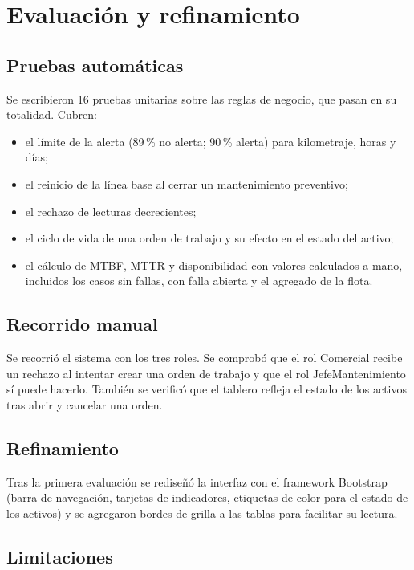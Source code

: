 \documentclass[12pt,letterpaper]{article}
\begin{document}
\section{Evaluación y refinamiento}\label{sec:evaluacion}

\subsection{Pruebas automáticas}

Se escribieron 16 pruebas unitarias sobre las reglas de negocio, que pasan en su totalidad. Cubren:

\begin{itemize}
  \item el límite de la alerta (89\,\% no alerta; 90\,\% alerta) para kilometraje, horas y días;
  \item el reinicio de la línea base al cerrar un mantenimiento preventivo;
  \item el rechazo de lecturas decrecientes;
  \item el ciclo de vida de una orden de trabajo y su efecto en el estado del activo;
  \item el cálculo de MTBF, MTTR y disponibilidad con valores calculados a mano, incluidos los casos sin fallas, con falla abierta y el agregado de la flota.
\end{itemize}

\subsection{Recorrido manual}

Se recorrió el sistema con los tres roles. Se comprobó que el rol Comercial recibe un rechazo al intentar crear una orden de trabajo y que el rol JefeMantenimiento sí puede hacerlo. También se verificó que el tablero refleja el estado de los activos tras abrir y cancelar una orden.

\subsection{Refinamiento}

Tras la primera evaluación se rediseñó la interfaz con el framework Bootstrap (barra de navegación, tarjetas de indicadores, etiquetas de color para el estado de los activos) y se agregaron bordes de grilla a las tablas para facilitar su lectura.

\subsection{Limitaciones}
\end{document}

